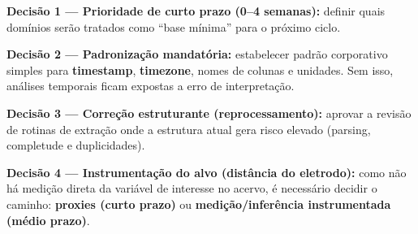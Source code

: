 \textbf{Decisão 1 --- Prioridade de curto prazo (0--4 semanas):} definir
quais domínios serão tratados como ``base mínima'' para o próximo ciclo.

\textbf{Decisão 2 --- Padronização mandatória:} estabelecer padrão
corporativo simples para \textbf{timestamp}, \textbf{timezone}, nomes de
colunas e unidades. Sem isso, análises temporais ficam expostas a erro
de interpretação.

\textbf{Decisão 3 --- Correção estruturante (reprocessamento):} aprovar
a revisão de rotinas de extração onde a estrutura atual gera risco
elevado (parsing, completude e duplicidades).

\textbf{Decisão 4 --- Instrumentação do alvo (distância do eletrodo):}
como não há medição direta da variável de interesse no acervo, é
necessário decidir o caminho: \textbf{proxies (curto prazo)} ou
\textbf{medição/inferência instrumentada (médio prazo)}.

\newpage
